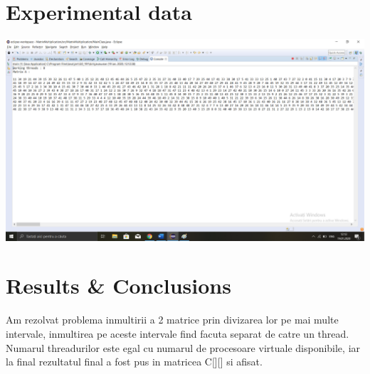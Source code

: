 \documentclass{article}
\begin{document}
\section{Experimental data}
\includegraphics[scale=0.5]{MatrixMultiplication.png}
\section{Results \& Conclusions}
Am rezolvat problema inmultirii a 2 matrice prin divizarea lor pe mai multe intervale, inmultirea pe aceste intervale find facuta separat de catre un thread. Numarul threadurilor este egal cu numarul de procesoare virtuale disponibile, iar la final rezultatul final a fost pus in matricea C[][] si afisat.
\end{document}
